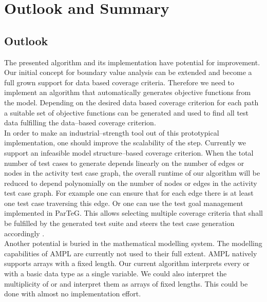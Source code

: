 \chapter{Outlook and Summary}
\section{Outlook}
The presented algorithm and its implementation have potential for improvement.
Our initial concept for boundary value analysis can be extended and become a full grown support for data based coverage criteria. Therefore we need to implement an algorithm that automatically generates objective functions from the model. Depending on the desired data based coverage criterion for each path a suitable set of objective functions can be generated and used to find all test data fulfilling the data--based coverage criterion.\\
In order to make an industrial--strength tool out of this prototypical implementation, one should improve the scalability of the  step. Currently we support an infeasible model structure--based coverage criterion. %
When the total number of test cases to generate depends linearly on the number of edges or nodes in the activity test case graph, the overall runtime of our algorithm will be reduced to depend polynomially on the number of nodes or edges in the activity test case graph. For example one can ensure that for each edge there is at least one test case traversing this edge. Or one can use the test goal management implemented in ParTeG. This allows selecting multiple coverage criteria that shall be fulfilled by the generated test suite and steers the test case generation accordingly \cite{weissleder2010parteg}.\\
Another potential is buried in the mathematical modelling system. The modelling capabilities of AMPL are currently not used to their full extent. AMPL natively supports arrays with a fixed length. Our current algorithm interprets every  or  with a basic data type as a single variable. We could also interpret the multiplicity of  or  and interpret them as arrays of fixed lengths. This could be done with almost no implementation effort.\\
